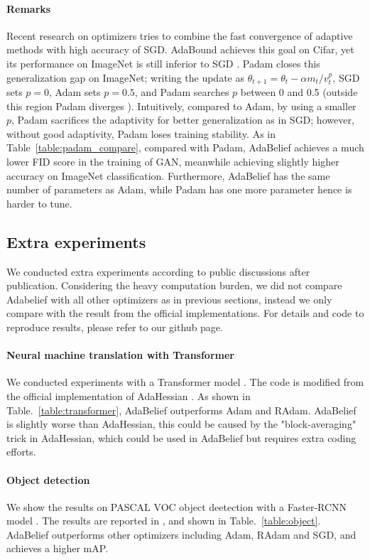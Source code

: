 \documentclass{article}
\begin{document}
\paragraph{Remarks} Recent research on optimizers tries to combine the fast convergence of adaptive methods with high accuracy of SGD. AdaBound \cite{luo2019adaptive} achieves this goal on Cifar, yet its performance on ImageNet is still inferior to SGD \cite{chen2018closing}. Padam \cite{chen2018closing} closes this generalization gap on ImageNet; writing the update as $\theta_{t+1}=\theta_t - \alpha m_t / v_t^p$, SGD sets $p=0$, Adam sets $p=0.5$, and Padam searches $p$ between 0 and 0.5 (outside this region Padam diverges \cite{chen2018closing,zhou2018convergence}). Intuitively, compared to Adam, by using a smaller $p$, Padam sacrifices the adaptivity for better generalization as in SGD; however, without good adaptivity, Padam loses training stability. As in Table~\ref{table:padam_compare}, compared with Padam, AdaBelief achieves a much lower FID score in the training of GAN, meanwhile achieving slightly higher accuracy on ImageNet classification. Furthermore, AdaBelief has the same number of parameters as Adam, while Padam has one more parameter hence is harder to tune.

\subsection{Extra experiments} 
We conducted extra experiments according to public discussions after publication. Considering the heavy computation burden, we did not compare Adabelief with all other optimizers as in previous sections, instead we only compare with the result from the official implementations. For details and code to reproduce results, please refer to our github page.

\paragraph{Neural machine translation with Transformer} We conducted experiments with a Transformer model \cite{vaswani2017attention}. The code is modified from the official implementation of AdaHessian \cite{yao2020adahessian}. As shown in Table.~\ref{table:transformer}, AdaBelief outperforms Adam and RAdam. AdaBelief is slightly worse than AdaHessian, this could be caused by the "block-averaging" trick in AdaHessian, which could be used in AdaBelief but requires extra coding efforts.

\paragraph{Object detection} We show the results on PASCAL VOC object deetection with a Faster-RCNN model \cite{ren2016faster}. The results are reported in \cite{yuan2020eadam}, and shown in Table.~\ref{table:object}. AdaBelief outperforms other optimizers including Adam, RAdam and SGD, and achieves a higher mAP.
\end{document}
